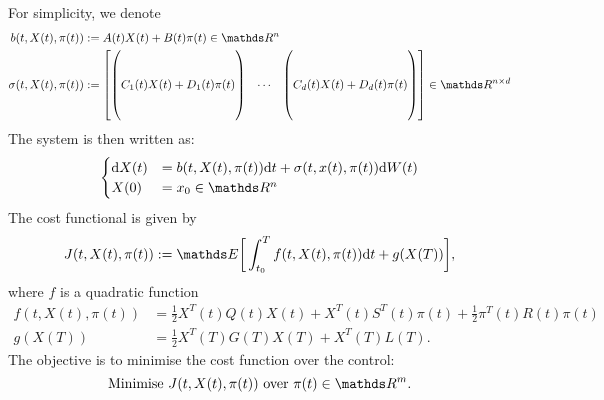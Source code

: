 For simplicity, we denote
\begin{align*}
    b(t, X(t), \pi(t))&:= A(t) X(t) + B(t) \pi (t) \in \R^{n}\\
    \sigma(t, X(t), \pi(t)) &:= 
    \begin{bmatrix}
        \begin{pmatrix}
            \\
            \\
            C_1(t) X(t) + D_1(t) \pi(t)\\
            \\
            \\
        \end{pmatrix} 
        & \cdots & 
        \begin{pmatrix}
            \\
            \\
            C_d(t) X(t) + D_d(t) \pi(t)\\
            \\
            \\
        \end{pmatrix}
    \end{bmatrix}
    \in \R^{n \times d}
\end{align*}
The system is then written as: 
\begin{equation}
    \begin{cases}
        \d X(t) &= b(t, X(t),\pi(t)) \d t + \sigma(t, x(t), \pi(t)) \d W(t)\\
        X(0) &= x_0 \in \R^n
    \end{cases}
    \label{eq: primal_sde2}
\end{equation}
The cost functional is given by
\begin{equation}
    J(t, X(t), \pi(t)) := \E \bigg[ \int_{t_0}^T f(t, X(t), \pi(t)) \d t + g(X(T))\bigg],
    \label{eq: cost_func}
\end{equation}
where $f$ is a quadratic function
\begin{align}
    f(t, X(t), \pi(t)) &= \frac12 X^T(t) Q(t) X(t) + X^T(t) S^T(t) \pi(t) + \frac12 \pi^T(t) R(t) \pi(t) \label{eq: f}\\
    g(X(T)) &= \frac12 X^T(T) G(T) X(T) + X^T(T) L(T). \label{eq: g}
\end{align}
The objective is to minimise the cost function over the control:
\begin{equation}
    \text{Minimise } J(t, X(t), \pi(t)) \text{ over } \pi(t) \in \R^m. \label{eq: minimisation_problem}
\end{equation}

